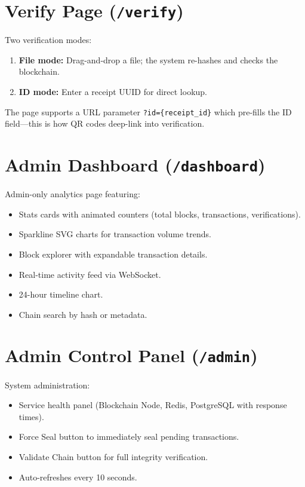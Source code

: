\documentclass[12pt, a4paper]{report}
\begin{document}
\section{Verify Page (\texttt{/verify})}

Two verification modes:
\begin{enumerate}
    \item \textbf{File mode:} Drag-and-drop a file; the system re-hashes and
          checks the blockchain.
    \item \textbf{ID mode:} Enter a receipt UUID for direct lookup.
\end{enumerate}

The page supports a URL parameter \texttt{?id=\{receipt\_id\}} which pre-fills
the ID field—this is how QR codes deep-link into verification.

\section{Admin Dashboard (\texttt{/dashboard})}

Admin-only analytics page featuring:
\begin{itemize}
    \item Stats cards with animated counters (total blocks, transactions,
          verifications).
    \item Sparkline SVG charts for transaction volume trends.
    \item Block explorer with expandable transaction details.
    \item Real-time activity feed via WebSocket.
    \item 24-hour timeline chart.
    \item Chain search by hash or metadata.
\end{itemize}

\section{Admin Control Panel (\texttt{/admin})}

System administration:
\begin{itemize}
    \item Service health panel (Blockchain Node, Redis, PostgreSQL with response times).
    \item Force Seal button to immediately seal pending transactions.
    \item Validate Chain button for full integrity verification.
    \item Auto-refreshes every 10 seconds.
\end{itemize}
\end{document}
